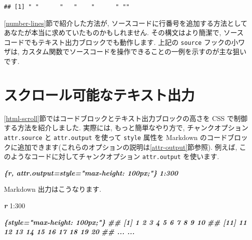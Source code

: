 \documentclass[
  11pt,
  lualatex,
  ja=standard]{bxjsreport}
\newenvironment{Shaded}{\begin{snugshade}}{\end{snugshade}}
\newcommand{\DecValTok}[1]{\textcolor[rgb]{0.00,0.00,0.81}{#1}}
\newcommand{\InformationTok}[1]{\textcolor[rgb]{0.56,0.35,0.01}{\textbf{\textit{#1}}}}
\newcommand{\SpecialCharTok}[1]{\textcolor[rgb]{0.00,0.00,0.00}{#1}}
\begin{document}
\begin{verbatim}
## [1] " "      "   "    "      " ""
\end{verbatim}

\ref{number-lines}節で紹介した方法が, ソースコードに行番号を追加する方法としてあなたが本当に求めていたものかもしれません. その構文はより簡潔で, ソースコードでもテキスト出力ブロックでも動作します. 上記の \texttt{source} フックの小ワザは, カスタム関数でソースコードを操作できることの一例を示すのが主な狙いです.

\hypertarget{hook-scroll}{%
\section{スクロール可能なテキスト出力}\label{hook-scroll}}

\ref{html-scroll}節ではコードブロックとテキスト出力ブロックの高さを CSS で制御する方法を紹介しました. 実際には, もっと簡単なやり方で, チャンクオプション \texttt{attr.source} と \texttt{attr.output} を使って \texttt{style} 属性を Markdown のコードブロックに追加できます(これらのオプションの説明は\ref{attr-output}節参照). 例えば, このようなコードに対してチャンクオプション \texttt{attr.output} を使います.

\begin{Shaded}
\begin{Highlighting}[]
\InformationTok{\textasciigrave{}\textasciigrave{}\textasciigrave{}\{r, attr.output=\textquotesingle{}style="max{-}height: 100px;"\textquotesingle{}\}}
\InformationTok{1:300}
\InformationTok{\textasciigrave{}\textasciigrave{}\textasciigrave{}}
\end{Highlighting}
\end{Shaded}

Markdown 出力はこうなります.

\begin{Shaded}
\begin{Highlighting}[]
\InformationTok{\textasciigrave{}\textasciigrave{}\textasciigrave{}r}
\DecValTok{1}\SpecialCharTok{:}\DecValTok{300}
\InformationTok{\textasciigrave{}\textasciigrave{}\textasciigrave{}}

\InformationTok{\textasciigrave{}\textasciigrave{}\textasciigrave{}\{style="max{-}height: 100px;"\}}
\InformationTok{\#\#   [1]   1   2   3   4   5   6   7   8   9  10}
\InformationTok{\#\#  [11]  11  12  13  14  15  16  17  18  19  20}
\InformationTok{\#\#  ... ...}
\InformationTok{\textasciigrave{}\textasciigrave{}\textasciigrave{}}
\end{Highlighting}
\end{Shaded}
\end{document}
